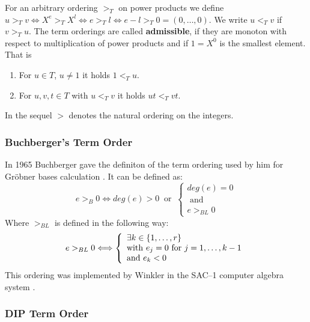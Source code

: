 For an arbitrary ordering $ >_T $ on power products we define
$         u >_T v    \Longleftrightarrow
    X^{e} >_T X^{l}  \Longleftrightarrow
        e >_T l      \Longleftrightarrow
    e - l >_T 0 = (0,\ldots,0) $.
We write $ u <_T v $ if $ v >_T u $.
The term orderings are called {\bf admissible}, if they
are monoton with respect to multiplication of power products
and if $1 = X^0$ is the smallest element.
That is 
\begin{enumerate}
\item For $u \in T$, $u \neq 1$ it holds $1 <_T u$.
\item For $u, v, t \in T$ with $u <_T v$ it holds $u t <_T v t$.  
\end{enumerate}
In the sequel $ > $ denotes the natural ordering on the integers.


\subsubsection{Buchberger's Term Order}

In 1965 Buchberger gave the definiton
of the term ordering used by him for Gr\"obner bases calculation
\cite{Buchberger 65,Buchberger 70}.
It can be defined as:
\begin{displaymath}
 e >_B  0  \Longleftrightarrow
 deg(e) > 0 \ \mbox{ or } \
   \left\{
   \begin{array}{l}
   deg(e) = 0  \\
   \mbox{ and } \\
   e >_{BL} 0
   \end{array}
   \right.
\end{displaymath}
Where $>_{BL}$ is defined in the following way:
\begin{displaymath}
 e >_{BL} 0 \Longleftrightarrow
   \left\{
   \begin{array}{l}
   \exists k \in \{1,\ldots,r\} \\
   {\rm with} \ e_j = 0 \ {\rm for} \ j=1,\ldots,k-1 \\
   {\rm and} \ e_k < 0
   \end{array}
   \right.
\end{displaymath}
This ordering was implemented by Winkler in the
SAC--1 computer algebra system \cite{Winkler 85}.


\subsubsection{DIP Term Order}

